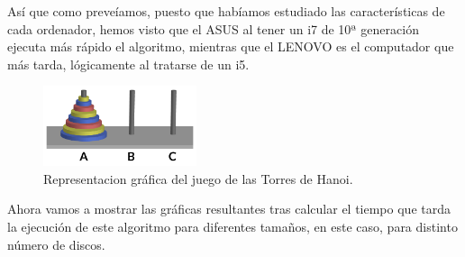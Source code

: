 \documentclass{homework}
\begin{document}
    Así que como preveíamos, puesto que habíamos estudiado las características de cada ordenador, hemos visto que el ASUS al 
    tener un i7 de 10ª generación ejecuta más rápido el algoritmo, mientras que el LENOVO es el computador que más tarda, 
    lógicamente al tratarse de un i5.

    \begin{figure}[h]
        \centering
        \includegraphics[width=0.4\textwidth]{img/hanoi.png}
        \caption{Representacion gráfica del juego de las Torres de Hanoi.}
    \end{figure}

    Ahora vamos a mostrar las gráficas resultantes tras calcular el tiempo que tarda la ejecución de este algoritmo para diferentes
    tamaños, en este caso, para distinto número de discos.
\end{document}
